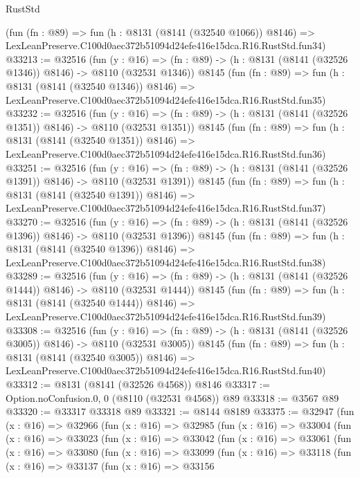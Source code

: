 \begin{lexlean}{RustStd}
\begin{coremodule}
    (fun (fn : @89) =>
    fun (h : @8131 (@8141 (@32540 @1066)) @8146) =>
    LexLeanPreserve.C100d0aec372b51094d24efe416e15dca.R16.RustStd.fun34)
@33213 := @32516
    (fun (y : @16) =>
    (fn : @89) -> (h : @8131 (@8141 (@32526 @1346)) @8146) -> @8110 (@32531 @1346))
    @8145
    (fun (fn : @89) =>
    fun (h : @8131 (@8141 (@32540 @1346)) @8146) =>
    LexLeanPreserve.C100d0aec372b51094d24efe416e15dca.R16.RustStd.fun35)
@33232 := @32516
    (fun (y : @16) =>
    (fn : @89) -> (h : @8131 (@8141 (@32526 @1351)) @8146) -> @8110 (@32531 @1351))
    @8145
    (fun (fn : @89) =>
    fun (h : @8131 (@8141 (@32540 @1351)) @8146) =>
    LexLeanPreserve.C100d0aec372b51094d24efe416e15dca.R16.RustStd.fun36)
@33251 := @32516
    (fun (y : @16) =>
    (fn : @89) -> (h : @8131 (@8141 (@32526 @1391)) @8146) -> @8110 (@32531 @1391))
    @8145
    (fun (fn : @89) =>
    fun (h : @8131 (@8141 (@32540 @1391)) @8146) =>
    LexLeanPreserve.C100d0aec372b51094d24efe416e15dca.R16.RustStd.fun37)
@33270 := @32516
    (fun (y : @16) =>
    (fn : @89) -> (h : @8131 (@8141 (@32526 @1396)) @8146) -> @8110 (@32531 @1396))
    @8145
    (fun (fn : @89) =>
    fun (h : @8131 (@8141 (@32540 @1396)) @8146) =>
    LexLeanPreserve.C100d0aec372b51094d24efe416e15dca.R16.RustStd.fun38)
@33289 := @32516
    (fun (y : @16) =>
    (fn : @89) -> (h : @8131 (@8141 (@32526 @1444)) @8146) -> @8110 (@32531 @1444))
    @8145
    (fun (fn : @89) =>
    fun (h : @8131 (@8141 (@32540 @1444)) @8146) =>
    LexLeanPreserve.C100d0aec372b51094d24efe416e15dca.R16.RustStd.fun39)
@33308 := @32516
    (fun (y : @16) =>
    (fn : @89) -> (h : @8131 (@8141 (@32526 @3005)) @8146) -> @8110 (@32531 @3005))
    @8145
    (fun (fn : @89) =>
    fun (h : @8131 (@8141 (@32540 @3005)) @8146) =>
    LexLeanPreserve.C100d0aec372b51094d24efe416e15dca.R16.RustStd.fun40)
@33312 := @8131 (@8141 (@32526 @4568)) @8146
@33317 := Option.noConfusion.{0, 0} (@8110 (@32531 @4568)) @89
@33318 := @3567 @89
@33320 := @33317 @33318 @89
@33321 := @8144 @8189
@33375 := @32947
    (fun (x : @16) =>
    @32966
      (fun (x : @16) =>
      @32985
        (fun (x : @16) =>
        @33004
          (fun (x : @16) =>
          @33023
            (fun (x : @16) =>
            @33042
              (fun (x : @16) =>
              @33061
                (fun (x : @16) =>
                @33080
                  (fun (x : @16) =>
                  @33099
                    (fun (x : @16) =>
                    @33118
                      (fun (x : @16) =>
                      @33137
                        (fun (x : @16) =>
                        @33156

\end{coremodule}
\end{lexlean}
